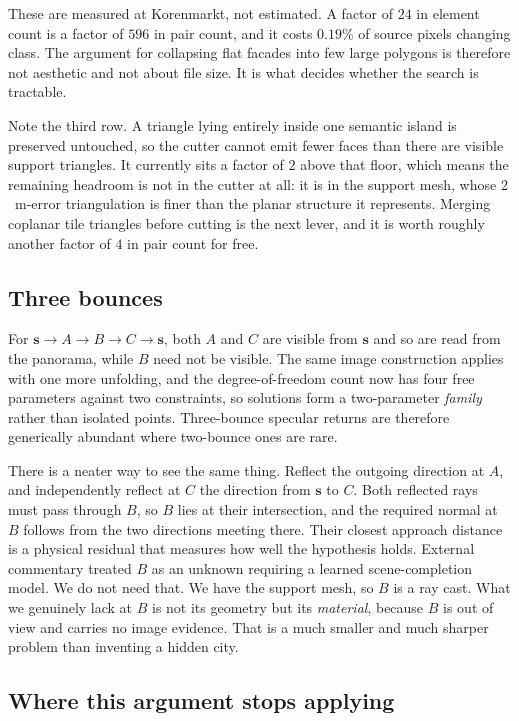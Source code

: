 \documentclass[11pt,a4paper]{article}
\newcommand{\bs}{\mathbf{s}}
\begin{document}
These are measured at Korenmarkt, not estimated. A factor of $24$ in element
count is a factor of $596$ in pair count, and it costs $0.19\%$ of source pixels
changing class. The argument for collapsing flat facades into few large polygons
is therefore not aesthetic and not about file size. It is what decides whether
the search is tractable.

Note the third row. A triangle lying entirely inside one semantic island is
preserved untouched, so the cutter cannot emit fewer faces than there are visible
support triangles. It currently sits a factor of $2$ above that floor, which means
the remaining headroom is not in the cutter at all: it is in the support mesh,
whose $2$~m-error triangulation is finer than the planar structure it represents.
Merging coplanar tile triangles before cutting is the next lever, and it is worth
roughly another factor of $4$ in pair count for free.

\subsection{Three bounces}

For $\bs \to A \to B \to C \to \bs$, both $A$ and $C$ are visible from $\bs$ and
so are read from the panorama, while $B$ need not be visible. The same image
construction applies with one more unfolding, and the degree-of-freedom count now
has four free parameters against two constraints, so solutions form a
two-parameter \emph{family} rather than isolated points. Three-bounce specular
returns are therefore generically abundant where two-bounce ones are rare.

There is a neater way to see the same thing. Reflect the outgoing direction at
$A$, and independently reflect at $C$ the direction from $\bs$ to $C$. Both
reflected rays must pass through $B$, so $B$ lies at their intersection, and the
required normal at $B$ follows from the two directions meeting there. Their
closest approach distance is a physical residual that measures how well the
hypothesis holds. External commentary treated $B$ as an unknown requiring a
learned scene-completion model. We do not need that. We have the support mesh, so
$B$ is a ray cast. What we genuinely lack at $B$ is not its geometry but its
\emph{material}, because $B$ is out of view and carries no image evidence. That is
a much smaller and much sharper problem than inventing a hidden city.

\subsection{Where this argument stops applying}
\label{subsec:stops}
\end{document}
